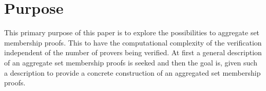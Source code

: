 






\section*{Purpose}
This primary purpose of this paper is to explore the possibilities to aggregate set membership proofs. This to have the computational complexity of the verification independent of the number of provers being verified.  At first a general description of an aggregate set membership proofs is seeked and then the goal is, given such a description to provide a concrete construction of an aggregated set membership proofs.


